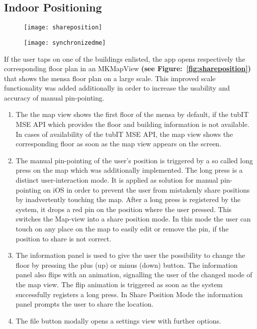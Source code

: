 \subsection{Indoor Positioning}

\begin{figure}
\centering
\begin{minipage}{.5\textwidth}
  \centering
  \texttt{[image: shareposition]}
  \label{fig:shareposition}
\end{minipage}%
\begin{minipage}{.5\textwidth}
  \centering
  \texttt{[image: synchronizedme]}
  \label{fig:synchronizedme}
\end{minipage}
\end{figure}


If the user taps on one of the buildings enlisted, the app opens respectively the corresponding floor plan in an MKMapView \textbf{(see Figure:~\ref{fig:shareposition})} that shows the mensa floor plan on a large scale. This improved scale functionality was added additionally in order to increase the usability and accuracy of manual pin-pointing.

\begin{enumerate}
\item The the map view shows the first floor of the mensa by default, if the tubIT MSE API which provides the floor and building information is not available. In cases of availability of the tubIT MSE API, the map view shows the corresponding floor as soon as the map view appears on the screen.

\item The manual pin-pointing of the user's position is triggered by a so called long press on the map which was additionally implemented. The long press is a distinct user-interaction mode. It is applied as solution for manual pin-pointing on iOS in order to prevent the user from mistakenly share  positions by inadvertently touching the map. After a long press is registered by the system, it drops a red pin on the position where the user pressed. This switches the Map-view into a share position mode. In this mode the user can touch on any place on the map to easily edit or remove the pin, if the position to share is not correct.

\item The information panel is used to give the user the possibility to change the floor by pressing the plus (up) or minus (down) button. The information panel also flips with an animation, signalling the user of the changed mode of the map view. The flip animation is triggered as soon as the system successfully registers a long press. In Share Position Mode the information panel prompts the user to share the location.

\item The file button modally opens a settings view with further options.
\end{enumerate}


